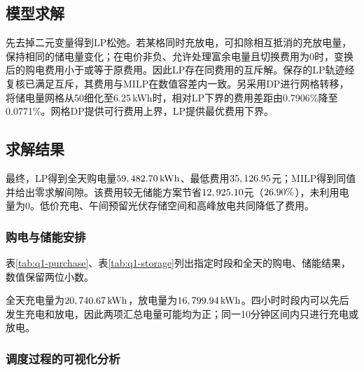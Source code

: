 \subsection{模型求解}

先去掉二元变量得到LP松弛。若某格同时充放电，可扣除相互抵消的充放电量，保持相同的储电量变化；在电价非负、允许处理富余电量且切换费用为0时，变换后的购电费用小于或等于原费用。因此LP存在同费用的互斥解。保存的LP轨迹经复核已满足互斥，其费用与MILP在数值容差内一致。另采用DP进行网格转移，将储电量网格从50细化至6.25\,kWh时，相对LP下界的费用差距由0.7906\%降至0.0771\%。网格DP提供可行费用上界，LP提供最优费用下界。

\subsection{求解结果}

最终，LP得到全天购电量$59,482.70\,\mathrm{kWh}$、最低费用$35,126.95$元；MILP得到同值并给出零求解间隙。该费用较无储能方案节省$12,925.10$元（$26.90\%$），未利用电量为0。低价充电、午间预留光伏存储空间和高峰放电共同降低了费用。

\subsubsection{购电与储能安排}

表\ref{tab:q1-purchase}、表\ref{tab:q1-storage}列出指定时段和全天的购电、储能结果，数值保留两位小数。

\begin{table}[H]
    \centering\small
    \caption{指定时段购电量及全天购电结果（电量单位：kWh）}
    \label{tab:q1-purchase}
    \renewcommand{\arraystretch}{1.2}
    
\end{table}

\begin{table}[H]
    \centering\small
    \caption{指定时段充放电量及首末储电量（单位：kWh）}
    \label{tab:q1-storage}
    \renewcommand{\arraystretch}{1.2}
    
\end{table}

全天充电量为$20,740.67\,\mathrm{kWh}$，放电量为$16,799.94\,\mathrm{kWh}$。四小时时段内可以先后发生充电和放电，因此两项汇总电量可能均为正；同一10分钟区间内只进行充电或放电。

\subsubsection{调度过程的可视化分析}


